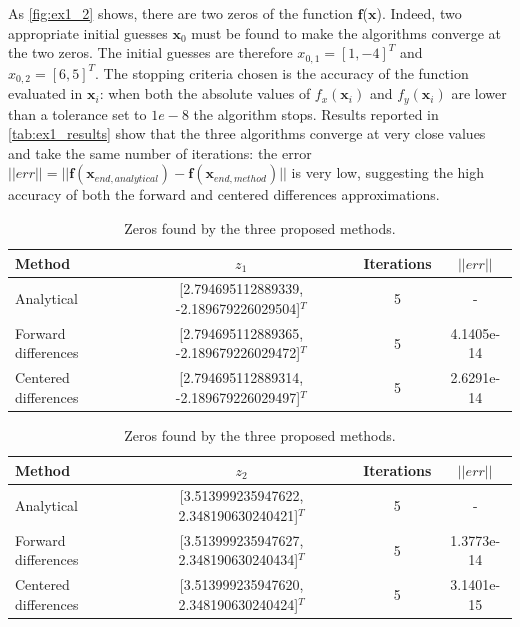 \documentclass[11pt,a4paper,oneside]{article}
\renewcommand{\vec}[1]{\mathbf{#1}}
\begin{document}
As \autoref{fig:ex1_2} shows, there are two zeros of the function $\vec{f}$($\vec{x}$). 
Indeed, two appropriate initial guesses $\vec{x}_0$ must be found to make the algorithms converge 
at the two zeros. The initial guesses are therefore $x_{0,1}={[1, -4]}^T$ and $x_{0,2}={[6, 5]}^T$. 
The stopping criteria chosen is the accuracy of the function evaluated in $\vec{x}_i$: when both 
the absolute values of $f_x(\vec{x}_i)$ and $f_y(\vec{x}_i)$ are lower than a tolerance set to ${1e-8}$ 
the algorithm stops. Results reported in \autoref{tab:ex1_results} show that the three algorithms 
converge at very close values and take the same number of iterations: the error 
$||err||=||\vec{f}(\vec{x}_{end,analytical}) - \vec{f}(\vec{x}_{end,method})||$ is very low, 
suggesting the high accuracy of both the forward and centered differences approximations.
\begin{table}[ht]
    \centering
    \begin{tabular}{l|c c c}
        \textbf{Method} & \mbox{\boldmath $z_1$} & \textbf{Iterations} &  \mbox{\boldmath $||err||$} \\
        \midrule
        \midrule
        Analytical                  & [2.794695112889339, -2.189679226029504]$^T$  & 5 & -\\
        Forward differences         & [2.794695112889365, -2.189679226029472]$^T$  & 5 & 4.1405e-14\\
        Centered differences        & [2.794695112889314, -2.189679226029497]$^T$  & 5 & 2.6291e-14\\
        \toprule
    \end{tabular}
    \begin{tabular}{l|c c c}
        \textbf{Method} & \mbox{\boldmath $z_2$} & \textbf{Iterations} &  \mbox{\boldmath $||err||$} \\
        \midrule
        \midrule
        Analytical                  & [3.513999235947622, 2.348190630240421]$^T$  & 5 & -\\
        Forward differences         & [3.513999235947627, 2.348190630240434]$^T$  & 5 & 1.3773e-14\\
        Centered differences        & [3.513999235947620, 2.348190630240424]$^T$  & 5 & 3.1401e-15\\
    \end{tabular}
    \caption{Zeros found by the three proposed methods.}\label{tab:ex1_results}
\end{table}

\end{document}
